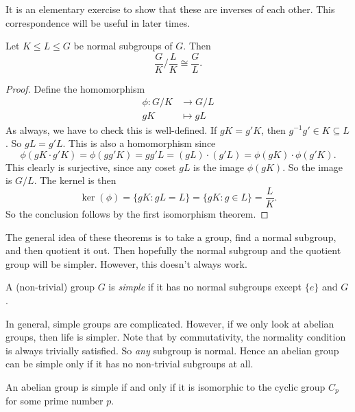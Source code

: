 \documentclass[a4paper]{article}
\begin{document}
It is an elementary exercise to show that these are inverses of each other. This correspondence will be useful in later times.

\begin{thm}
  Let $K \leq L \leq G$ be normal subgroups of $G$. Then
  \[
    \frac{G}{K}\big/ \frac{L}{K} \cong \frac{G}{L}.
  \]
\end{thm}

\begin{proof}
  Define the homomorphism
  \begin{align*}
    \phi: G/K &\to G/L\\
    gK &\mapsto gL
  \end{align*}
  As always, we have to check this is well-defined. If $gK = g'K$, then $g^{-1}g' \in K \subseteq L$. So $gL = g'L$. This is also a homomorphism since
  \[
    \phi(gK \cdot g'K) = \phi(gg'K) = gg'L = (gL) \cdot (g'L) = \phi(gK) \cdot \phi(g'K).
  \]
  This clearly is surjective, since any coset $gL$ is the image $\phi(gK)$. So the image is $G/L$. The kernel is then
  \[
    \ker(\phi) = \{gK: gL = L\} = \{gK: g \in L\} = \frac{L}{K}.
  \]
  So the conclusion follows by the first isomorphism theorem.
\end{proof}

The general idea of these theorems is to take a group, find a normal subgroup, and then quotient it out. Then hopefully the normal subgroup and the quotient group will be simpler. However, this doesn't always work.

\begin{defi}
  A (non-trivial) group $G$ is \emph{simple} if it has no normal subgroups except $\{e\}$ and $G$.
\end{defi}

In general, simple groups are complicated. However, if we only look at abelian groups, then life is simpler. Note that by commutativity, the normality condition is always trivially satisfied. So \emph{any} subgroup is normal. Hence an abelian group can be simple only if it has no non-trivial subgroups at all.

\begin{lemma}
  An abelian group is simple if and only if it is isomorphic to the cyclic group $C_p$ for some prime number $p$.
\end{lemma}
\end{document}
